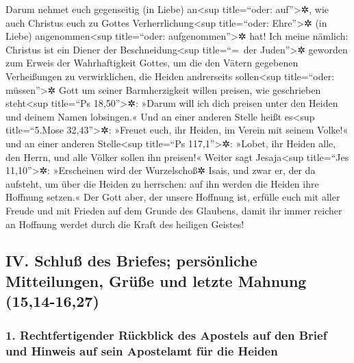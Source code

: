  Darum nehmet euch gegenseitig (in Liebe) an\textless sup
title=``oder: auf''\textgreater✲, wie auch Christus euch zu Gottes
Verherrlichung\textless sup title=``oder: Ehre''\textgreater✲ (in Liebe)
angenommen\textless sup title=``oder: aufgenommen''\textgreater✲ hat!
 Ich meine nämlich: Christus ist ein Diener der
Beschneidung\textless sup title=``=~der Juden''\textgreater✲ geworden
zum Erweis der Wahrhaftigkeit Gottes, um die den Vätern gegebenen
Verheißungen zu verwirklichen,  die Heiden andrerseits
sollen\textless sup title=``oder: müssen''\textgreater✲ Gott um seiner
Barmherzigkeit willen preisen, wie geschrieben steht\textless sup
title=``Ps 18,50''\textgreater✲: »Darum will ich dich preisen unter den
Heiden und deinem Namen lobsingen.«  Und an einer anderen
Stelle heißt es\textless sup title=``5.Mose 32,43''\textgreater✲:
»Freuet euch, ihr Heiden, im Verein mit seinem Volke!« 
und an einer anderen Stelle\textless sup title=``Ps
117,1''\textgreater✲: »Lobet, ihr Heiden alle, den Herrn, und alle
Völker sollen ihn preisen!«  Weiter sagt
Jesaja\textless sup title=``Jes 11,10''\textgreater✲: »Erscheinen wird
der Wurzelschoß✲ Isais, und zwar er, der da aufsteht, um über die Heiden
zu herrschen: auf ihn werden die Heiden ihre Hoffnung setzen.«
 Der Gott aber, der unsere Hoffnung ist, erfülle euch mit
aller Freude und mit Frieden auf dem Grunde des Glaubens, damit ihr
immer reicher an Hoffnung werdet durch die Kraft des heiligen Geistes!

\hypertarget{iv.-schluuxdf-des-briefes-persuxf6nliche-mitteilungen-gruxfcuxdfe-und-letzte-mahnung-1514-1627}{%
\subsection{IV. Schluß des Briefes; persönliche Mitteilungen, Grüße und
letzte Mahnung
(15,14-16,27)}\label{iv.-schluuxdf-des-briefes-persuxf6nliche-mitteilungen-gruxfcuxdfe-und-letzte-mahnung-1514-1627}}

\hypertarget{rechtfertigender-ruxfcckblick-des-apostels-auf-den-brief-und-hinweis-auf-sein-apostelamt-fuxfcr-die-heiden}{%
\subsubsection{1. Rechtfertigender Rückblick des Apostels auf den Brief
und Hinweis auf sein Apostelamt für die
Heiden}\label{rechtfertigender-ruxfcckblick-des-apostels-auf-den-brief-und-hinweis-auf-sein-apostelamt-fuxfcr-die-heiden}}

